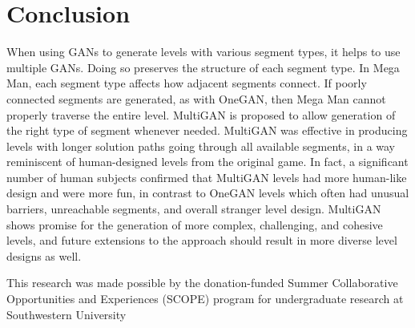 

\section{Conclusion}

When using GANs to generate levels with various segment types, it helps to use multiple GANs. Doing so preserves the structure of each segment type. In Mega Man, each segment type affects how adjacent segments connect.
If poorly connected segments are generated, as with OneGAN, then Mega Man cannot properly traverse the entire level.
MultiGAN is proposed to allow generation of the right type of segment whenever needed. 
MultiGAN was effective in producing levels with longer solution paths going through all available segments, in a way reminiscent of human-designed levels from the original game. 
In fact, a significant number of human subjects confirmed that MultiGAN levels had more human-like design and were more fun, in contrast to OneGAN levels which often had unusual barriers, unreachable segments, and overall stranger level design. 
MultiGAN shows promise for the generation of more complex, challenging, and cohesive levels, and future extensions to the approach should result in more diverse level designs as well.


\begin{acks}

This research was made possible by the donation-funded Summer Collaborative Opportunities and Experiences (SCOPE) program for undergraduate research at Southwestern University

\end{acks}
